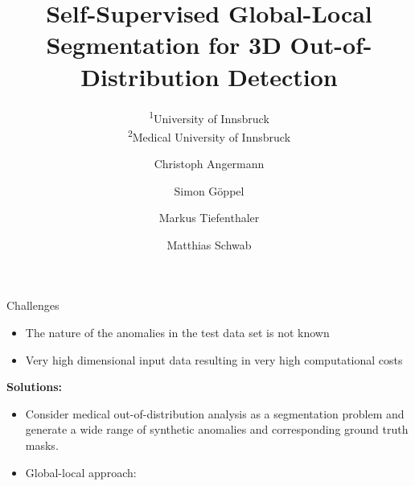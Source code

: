 \documentclass[10pt,aspectratio=169]{beamer}
\title[]{Self-Supervised Global-Local Segmentation for 3D Out-of-Distribution Detection}
\subtitle{\textsuperscript{1}University of Innsbruck\\ \textsuperscript{2}Medical University of Innsbruck}
\author[Angermann et al.]{Christoph Angermann \inst{1} \and Simon Göppel \inst{1} \and Markus Tiefenthaler \inst{2} \and Matthias Schwab \inst{2}}
\date{}
\begin{document}







\begin{frame}{Challenges}
	\begin{itemize}
		\item The nature of the anomalies in the test data set is not known
		\item Very high dimensional input data resulting in very high computational costs
	\end{itemize}
	\pause \vspace{1.5em}
	{\Large\textbf{Solutions:  }}\pause \vspace{1.5em}

	\begin{itemize}
		\item Consider medical out-of-distribution analysis as a segmentation problem  and generate a wide range of synthetic anomalies and corresponding ground truth masks. 
		\item Global-local approach: 

	\end{itemize}
\end{frame}
\end{document}
